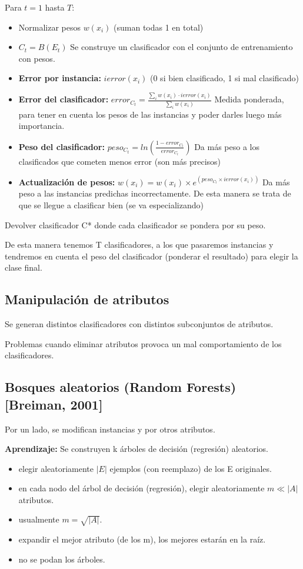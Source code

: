 \documentclass[12pt, twoside, openright]{report} %
\begin{document}
Para $t = 1$ hasta $T$:
\begin{itemize}
	\item Normalizar pesos $w(x_i)$ (suman todas 1 en total)
	\item $C_t = B(E_t)$ Se construye un clasificador con el conjunto de entrenamiento con pesos.
	\item \textbf{Error por instancia:} $ierror(x_i)$ (0 si bien clasificado, 1 si mal clasificado)
	\item \textbf{Error del clasificador:} $error_{C_t} = \frac {\sum_i w(x_i)\cdot ierror(x_i)} {\sum_i w(x_i)}$ Medida ponderada, para tener en cuenta los pesos de las instancias y poder darles luego más importancia.
	\item \textbf{Peso del clasificador:} $peso_{C_t} = ln \left( \frac{1-error_{C_t}}{error_{C_t}} \right)$ Da más peso a los clasificados que cometen menos error (son más precisos)
	\item \textbf{Actualización de pesos:} $w(x_i) = w(x_i) \times e^{(peso_{C_t} \times ierror(x_i))}$ Da más peso a las instancias predichas incorrectamente. De esta manera se trata de que se llegue a clasificar bien (se va especializando)
\end{itemize}
Devolver clasificador C* donde cada clasificador se pondera por su peso.

De esta manera tenemos T clasificadores, a los que pasaremos instancias y tendremos en cuenta el peso del clasificador (ponderar el resultado) para elegir la clase final.

\subsection{Manipulación de atributos}
Se generan distintos clasificadores con distintos subconjuntos de atributos.

Problemas cuando eliminar atributos provoca un mal comportamiento de los clasificadores.

\subsection{Bosques aleatorios (Random Forests) [Breiman, 2001]}
Por un lado, se modifican instancias y por otros atributos.

\textbf{Aprendizaje:} Se construyen k árboles de decisión (regresión) aleatorios.
\begin{itemize}
	\item elegir aleatoriamente $|E|$ ejemplos (con reemplazo) de los E originales.
	\item en cada nodo del árbol de decisión (regresión), elegir aleatoriamente $m \ll |A|$ atributos.
	\item usualmente $m = \sqrt{|A|}$.
	\item expandir el mejor atributo (de los m), los mejores estarán en la raíz.
	\item no se podan los árboles.
\end{itemize}
\end{document}
